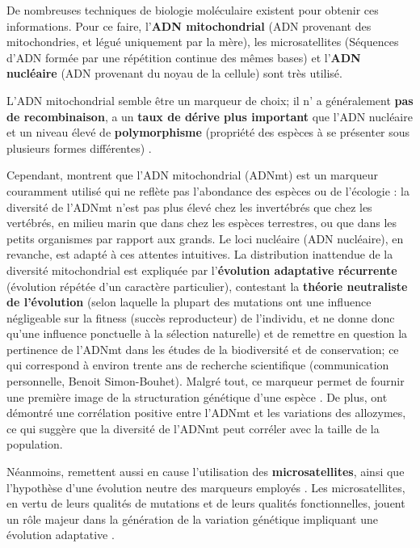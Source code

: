 \documentclass[a4paper,11pt,twoside]{report}
\begin{document}
De nombreuses techniques de biologie moléculaire existent pour obtenir ces informations. Pour ce faire, l'\textbf{ADN mitochondrial} (ADN provenant des mitochondries, et légué uniquement par la mère), les microsatellites (Séquences d'ADN formée par une répétition continue des mêmes bases) et l'\textbf{ADN nucléaire} (ADN provenant du noyau de la cellule) sont très utilisé. 

L'ADN mitochondrial semble être un marqueur de choix; il n' a généralement \textbf{pas de recombinaison}, a un \textbf{taux de dérive plus important} que l'ADN nucléaire et un niveau élevé de \textbf{polymorphisme} (propriété des espèces à se présenter sous plusieurs formes différentes) \citep{avise2000abandon,aurelle2009aa}. 

Cependant, \citep{bazin2006population} montrent que l'ADN mitochondrial (ADNmt) est un marqueur couramment utilisé qui ne reflète pas l'abondance des espèces ou de l'écologie : la diversité de l'ADNmt n'est pas plus élevé chez les invertébrés que chez les vertébrés, en milieu marin que dans chez les espèces terrestres, ou que dans les petits organismes par rapport aux grands. Le loci nucléaire (ADN nucléaire), en revanche, est adapté à ces attentes intuitives. La distribution inattendue de la diversité mitochondrial est expliquée par l'\textbf{évolution adaptative récurrente} (évolution répétée d'un caractère particulier), contestant la \textbf{théorie neutraliste de l'évolution} (selon laquelle la plupart des mutations ont une influence négligeable sur la fitness (succès reproducteur) de l'individu, et ne donne donc qu'une influence ponctuelle à la sélection naturelle) et de remettre en question la pertinence de l'ADNmt dans les études de la biodiversité et de conservation; ce qui correspond à environ trente ans de recherche scientifique (communication personnelle, Benoit Simon-Bouhet). Malgré tout, ce marqueur permet de fournir une première image de la structuration génétique d'une espèce \citep{aurelle2009aa}. De plus, \citep{kitchen2008three} ont démontré une corrélation positive entre l'ADNmt et les variations des allozymes, ce qui suggère que la diversité de l'ADNmt peut corréler avec la taille de la population.

Néanmoins, \citep{kashi2006simple} remettent aussi en cause l'utilisation des \textbf{microsatellites}, ainsi que l'hypothèse d'une évolution neutre des marqueurs employés \citep{aurelle2009aa}. Les microsatellites, en vertu de leurs qualités de mutations et de leurs qualités fonctionnelles, jouent un rôle majeur dans la génération de la variation génétique impliquant une évolution adaptative \citep{kashi2006simple}.
\end{document}
